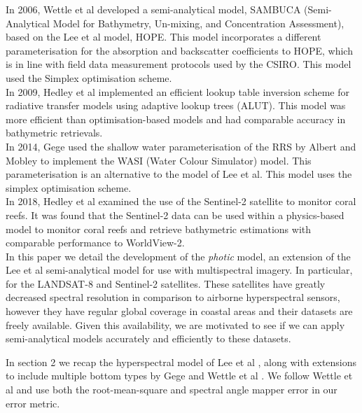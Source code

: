 \documentclass[12pt]{article}
\numberwithin{equation}{section}
\begin{document}
In 2006, Wettle et al \cite{wettle2006}\cite{brando2009} developed a semi-analytical model, SAMBUCA (Semi-Analytical 
Model for Bathymetry, Un-mixing, and Concentration Assessment), based on the Lee et al model, HOPE. 
This model incorporates a different parameterisation for the absorption and backscatter 
coefficients to HOPE, which is in line with field data measurement protocols used by the CSIRO. 
This model used the Simplex optimisation scheme. \\

In 2009, Hedley et al \cite{hedley2009} implemented an efficient lookup table inversion scheme 
for radiative transfer models using adaptive lookup trees (ALUT). This model was more efficient 
than optimisation-based models and had comparable accuracy in bathymetric retrievals. \\ 

In 2014, Gege \cite{gege2004} used the shallow water parameterisation of the RRS by Albert and 
Mobley \cite{albert2003} to implement the WASI (Water Colour Simulator) model. This parameterisation 
is an alternative to the model of Lee et al. This model uses the simplex optimisation scheme. \\

In 2018, Hedley et al \cite{hedley2018} examined the use of the Sentinel-2 satellite to monitor 
coral reefs. It was found that the Sentinel-2 data can be used within a physics-based model to 
monitor coral reefs and retrieve bathymetric estimations with comparable performance to WorldView-2. \\

In this paper we detail the development of the \textit{photic} model, an extension of 
the Lee et al \cite{lee1998}\cite{lee1999}\cite{lee2001} semi-analytical model for use with 
multispectral imagery. In particular, for the LANDSAT-8 and Sentinel-2 satellites. These 
satellites have greatly decreased spectral resolution in comparison to airborne 
hyperspectral sensors, however they have regular global coverage in coastal areas and their 
datasets are freely available. Given this availability, we are motivated to see if we can 
apply semi-analytical models accurately and efficiently to these datasets.

In section 2 we recap the hyperspectral model of Lee et al \cite{lee1998}\cite{lee1999}\cite{lee2001}, 
along with extensions to include multiple bottom types by Gege \cite{gege2004} and 
Wettle et al \cite{wettle2006}. We follow Wettle et al \cite{wettle2006} and use 
both the root-mean-square and spectral angle mapper error in our error metric.  \\
\end{document}
